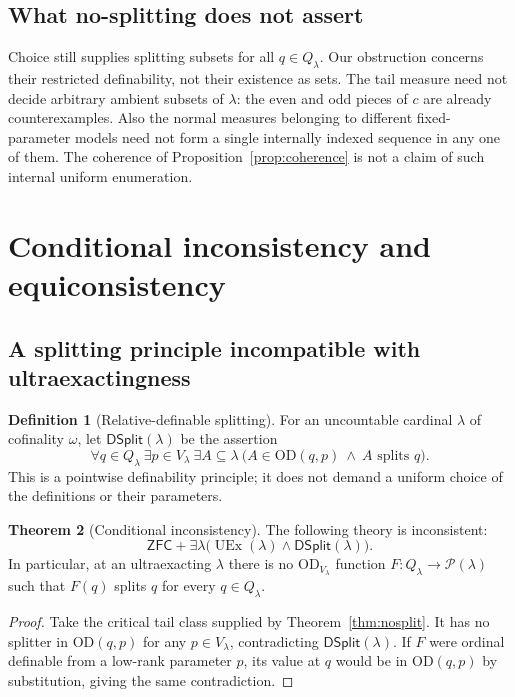 \documentclass[11pt,letterpaper]{article}
\theoremstyle{definition}
\newtheorem{definition}{Definition}[section]
\newtheorem{theorem}[definition]{Theorem}
\numberwithin{equation}{section}
\newcommand{\ZFC}{\mathsf{ZFC}}
\newcommand{\OD}{\mathrm{OD}}
\newcommand{\UEx}{\operatorname{UEx}}
\newcommand{\Pow}{\mathcal P}
\newcommand{\NS}{\mathsf{DSplit}}
\begin{document}
\subsection{What no-splitting does not assert}

Choice still supplies splitting subsets for all $q\in Q_\lambda$.
Our obstruction concerns their restricted definability, not their
existence as sets. The tail measure need not decide arbitrary ambient
subsets of $\lambda$: the even and odd pieces of $c$ are already
counterexamples. Also the normal measures belonging to different
fixed-parameter models need not form a single internally indexed
sequence in any one of them. The coherence of
Proposition~\ref{prop:coherence} is not a claim of such internal
uniform enumeration.

\section{Conditional inconsistency and equiconsistency}\label{sec:consistency}

\subsection{A splitting principle incompatible with ultraexactingness}

\begin{definition}[Relative-definable splitting]
For an uncountable cardinal $\lambda$ of cofinality $\omega$, let
$\NS(\lambda)$ be the assertion
\[
 \forall q\in Q_\lambda\ \exists p\in V_\lambda\ \exists A\subseteq\lambda
 \ \bigl(A\in\OD(q,p)\ \wedge\ A\text{ splits }q\bigr).
\]
This is a pointwise definability principle; it does not demand a
uniform choice of the definitions or their parameters.
\end{definition}

\begin{theorem}[Conditional inconsistency]\label{thm:splitincons}
The following theory is inconsistent:
\[
 \ZFC+\exists\lambda\bigl(\UEx(\lambda)\wedge\NS(\lambda)\bigr).
\]
In particular, at an ultraexacting $\lambda$ there is no
$\OD_{V_\lambda}$ function $F:Q_\lambda\to\Pow(\lambda)$ such that
$F(q)$ splits $q$ for every $q\in Q_\lambda$.
\end{theorem}

\begin{proof}
Take the critical tail class supplied by Theorem~\ref{thm:nosplit}.
It has no splitter in $\OD(q,p)$ for any $p\in V_\lambda$, contradicting
$\NS(\lambda)$. If $F$ were ordinal definable from a low-rank parameter
$p$, its value at $q$ would be in $\OD(q,p)$ by substitution, giving
the same contradiction.
\end{proof}
\end{document}
